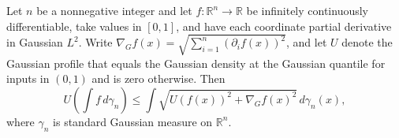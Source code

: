 \begin{theorem}
\label{BooleanAnalysis.GaussianSpace.gaussian_bobkov_finite_energy}
\leanok
{}
Let $n$ be a nonnegative integer and let $f:\mathbb R^n\to\mathbb R$ be infinitely
continuously differentiable, take values in $[0,1]$, and have each coordinate partial
derivative in Gaussian $L^2$. Write $\nabla_G f(x)=\sqrt{\sum_{i=1}^n (\partial_i
f(x))^2}$, and let $U$ denote the Gaussian profile that equals the Gaussian density at
the Gaussian quantile for inputs in $(0,1)$ and is zero otherwise. Then
\[
U\!\left(\int f\,d\gamma_n\right)\le \int \sqrt{U(f(x))^2+\nabla_G
f(x)^2}\,d\gamma_n(x),
\]
where $\gamma_n$ is standard Gaussian measure on $\mathbb R^n$.
\end{theorem}
